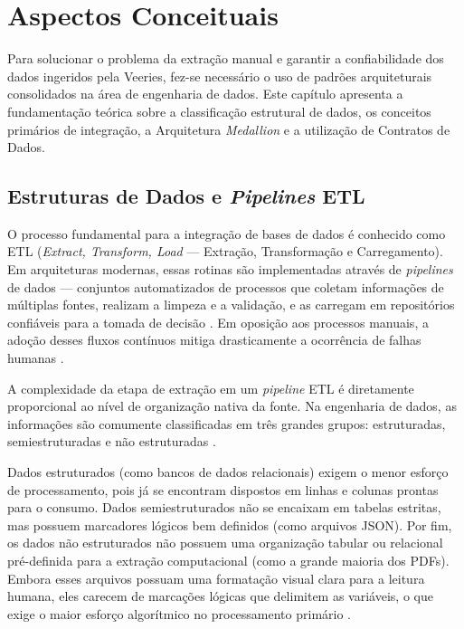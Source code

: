 \chapter{Aspectos Conceituais}

Para solucionar o problema da extração manual e garantir a confiabilidade dos dados ingeridos pela Veeries, fez-se necessário o uso de padrões arquiteturais consolidados na área de engenharia de dados. Este capítulo apresenta a fundamentação teórica sobre a classificação estrutural de dados, os conceitos primários de integração, a Arquitetura \textit{Medallion} e a utilização de Contratos de Dados.

\section{Estruturas de Dados e \textit{Pipelines} ETL}

O processo fundamental para a integração de bases de dados é conhecido como ETL (\textit{Extract, Transform, Load} — Extração, Transformação e Carregamento). Em arquiteturas modernas, essas rotinas são implementadas através de \textit{pipelines} de dados — conjuntos automatizados de processos que coletam informações de múltiplas fontes, realizam a limpeza e a validação, e as carregam em repositórios confiáveis para a tomada de decisão \cite{gujjala_medallion, polisetty23}. Em oposição aos processos manuais, a adoção desses fluxos contínuos mitiga drasticamente a ocorrência de falhas humanas \cite{reis22}.

A complexidade da etapa de extração em um \textit{pipeline} ETL é diretamente proporcional ao nível de organização nativa da fonte. Na engenharia de dados, as informações são comumente classificadas em três grandes grupos: estruturadas, semiestruturadas e não estruturadas \cite{gujjala_medallion}.

Dados estruturados (como bancos de dados relacionais) exigem o menor esforço de processamento, pois já se encontram dispostos em linhas e colunas prontas para o consumo. Dados semiestruturados não se encaixam em tabelas estritas, mas possuem marcadores lógicos bem definidos (como arquivos JSON). Por fim, os dados não estruturados não possuem uma organização tabular ou relacional pré-definida para a extração computacional (como a grande maioria dos PDFs). Embora esses arquivos possuam uma formatação visual clara para a leitura humana, eles carecem de marcações lógicas que delimitem as variáveis, o que exige o maior esforço algorítmico no processamento primário \cite{gujjala_medallion}.


